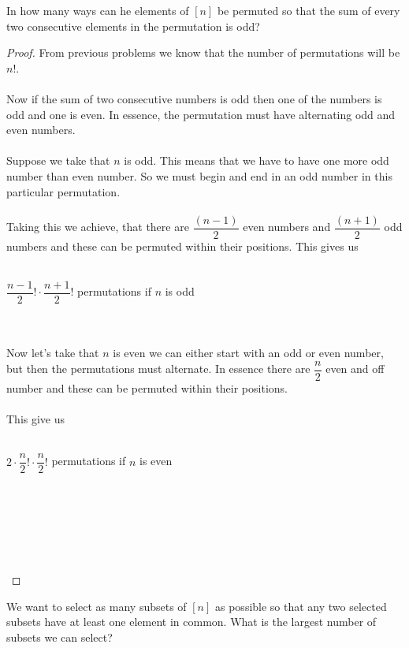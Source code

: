 \documentclass[12pt]{article}
\newenvironment{problem}[2][Problem]{\begin{trivlist}
\item[\hskip \labelsep {\bfseries #1}\hskip \labelsep {\bfseries #2.}]}{\end{trivlist}}
\begin{document}
\begin{problem}{4}
In how many ways can he elements of $[n]$ be permuted so that the sum of every two consecutive elements in the permutation is odd?
\end{problem}

\begin{proof}
From previous problems we know that the number of permutations will be $n!$. \\ \\
Now if the sum of two consecutive numbers is odd then one of the numbers is odd and one is even. In essence, the permutation must have alternating odd and even numbers. \\ \\
Suppose we take that $n$ is odd. This means that we have to have one more odd number than even number. So we must begin and end in an odd number in this particular permutation. \\ \\
Taking this we achieve, that there are $\dfrac{(n-1)}{2}$ even numbers and $\dfrac{(n+1)}{2}$ odd numbers and these can be permuted within their positions. This gives us \\ \\
\centerline{$\dfrac{n-1}{2}! \cdot \dfrac{n+1}{2}!$ permutations if $n$ is odd} \\ \\
Now let's take that $n$ is even we can either start with an odd or even number, but then the permutations must alternate. In essence there are $\dfrac{n}{2}$ even and off number and these can be permuted within their positions. \\ \\
This give us \\ \\
\centerline{$2 \cdot \dfrac{n}{2}! \cdot \dfrac{n}{2}!$ permutations if $n$ is even} \\ \\ \\
\centerline{} \\ \\

\end{proof}

\begin{problem}{5}
We want to select as many subsets of $[n]$ as possible so that any two selected subsets have at least one element in common. What is the largest number of subsets we can select?
\end{problem}
\end{document}
